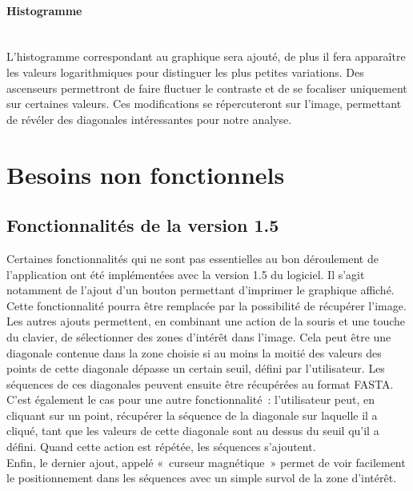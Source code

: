 \documentclass{report}
\begin{document}
\paragraph{Histogramme} ~\\
L'histogramme correspondant au graphique sera ajouté, de plus il fera apparaître les valeurs logarithmiques pour distinguer les plus petites variations.
Des ascenseurs permettront de faire fluctuer le contraste et de se focaliser uniquement sur certaines valeurs. Ces modifications  se répercuteront sur l'image, permettant de révéler des diagonales intéressantes pour notre analyse.

\section{Besoins non fonctionnels}

\subsection{Fonctionnalités de la version 1.5}
Certaines fonctionnalités qui ne sont pas essentielles au bon déroulement de l'application ont été implémentées avec la version 1.5 du logiciel. Il s'agit notamment de l'ajout d'un bouton permettant d'imprimer le graphique affiché. Cette fonctionnalité pourra être remplacée par la possibilité de récupérer l'image.\\
Les autres ajouts permettent, en combinant une action de la souris et une touche du clavier, de sélectionner des zones d'intérêt dans l'image. Cela peut être une diagonale contenue dans la zone choisie si au moins la moitié des valeurs des points de cette diagonale dépasse un certain seuil, défini par l'utilisateur. Les séquences de ces diagonales peuvent ensuite être récupérées au format FASTA.\\
C'est également le cas pour une autre fonctionnalité~: l'utilisateur peut, en cliquant sur un point, récupérer la séquence de la diagonale sur laquelle il a cliqué, tant que les valeurs de cette diagonale sont au dessus du seuil qu'il a défini. Quand cette action est répétée, les séquences s'ajoutent.\\
Enfin, le dernier ajout, appelé «~curseur magnétique~» permet de voir facilement le positionnement dans les séquences avec un simple survol de la zone d'intérêt.
\end{document}
